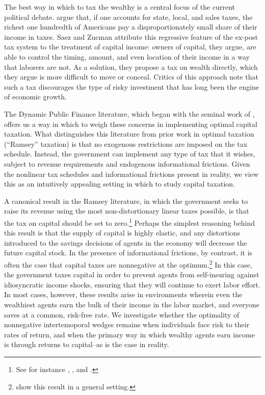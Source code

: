 \documentclass[11pt]{article}
\begin{document}
The best way in which to tax the wealthy is a central focus of the current political debate. \cite{saez2019triumph} argue that, if one accounts for state, local, and sales taxes, the richest one hundredth of Americans pay a disproportionately small share of their income in taxes. Saez and Zucman attribute this regressive feature of the ex-post tax system to the treatment of capital income: owners of capital, they argue, are able to control the timing, amount, and even location of their income in a way that laborers are not. As a solution, they propose a tax on wealth directly, which they argue is more difficult to move or conceal. Critics of this approach note that such a tax discourages the type of risky investment that has long been the engine of economic growth. 

The Dynamic Public Finance literature, which began with the seminal work of \cite{mirrlees1971exploration}, offers us a way in which to weigh these concerns in implementing optimal capital taxation. What distinguishes this literature from prior work in optimal taxation (``Ramsey'' taxation) is that no exogenous restrictions are imposed on the tax schedule. Instead, the government can implement any type of tax that it wishes, subject to revenue requirements and endogenous informational frictions. Given the nonlinear tax schedules and informational frictions present in reality, we view this as an intuitively appealing setting in which to study capital taxation. 

A canonical result in the Ramsey literature, in which the government seeks to raise its revenue using the most non-distortionary linear taxes possible, is that the tax on capital should be set to zero.\footnote{See for instance \cite{atkinson1976design}, \cite{chamley1986optimal}, and \cite{judd1982redistributive}.} Perhaps the simplest reasoning behind this result is that the supply of capital is highly elastic, and any distortions introduced to the savings decisions of agents in the economy will decrease the future capital stock. In the presence of informational frictions, by contrast, it is often the case that capital taxes are nonnegative at the optimum.\footnote{\cite{golosov2003optimal} show this result in a general setting.} In this case, the government taxes capital in order to prevent agents from self-insuring against idiosyncratic income shocks, ensuring that they will continue to exert labor effort. In most cases, however, these results arise in environments wherein even the wealthiest agents earn the bulk of their income in the labor market, and everyone saves at a common, risk-free rate. We investigate whether the optimality of nonnegative intertemoporal wedges remains when individuals face risk to their rates of return, and when the primary way in which wealthy agents earn income is through returns to capital--as is the case in reality. 
\end{document}
